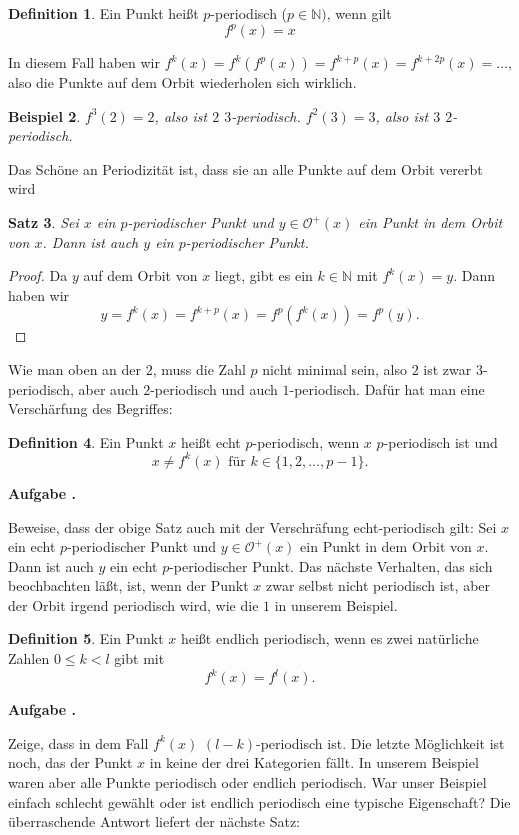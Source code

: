 \documentclass[a4paper,ngerman,12pt]{scrartcl}
\theoremstyle{definition}
\newtheorem{defn}{Definition}[section]
\theoremstyle{plain}
\newtheorem{satz}[defn]{Satz}
\newtheorem{beispiel}[defn]{Beispiel}
\theoremstyle{remark}
\newlength{\aufgabenskip}
\newcounter{aufgabennummer}
\newenvironment{aufgabe}[1]{
  \addtocounter{aufgabennummer}{1}
  \textbf{Aufgabe \theaufgabennummer.} \emph{#1} \par
}{\vspace{\aufgabenskip}}
\begin{document}
\begin{defn}
Ein Punkt heißt $p$-periodisch ($p\in\mathbb{N})$, wenn gilt
\[ 
f^p(x) =x 
\] 
\end{defn}
In diesem Fall haben wir $f^k(x) = f^k\left(f^p(x)\right) = f^{k+p} (x) = f^{k+2p} (x) = \ldots$, also die Punkte auf dem Orbit wiederholen sich wirklich. 
\begin{beispiel}
$f^{3}(2) = 2$, also ist $2$ $3$-periodisch. $f^2(3) = 3$, also ist $3$ $2$-periodisch. 
\end{beispiel}
Das Schöne an Periodizität ist, dass sie an alle Punkte auf dem Orbit vererbt wird
\begin{satz}
Sei $x$ ein $p$-periodischer Punkt und $y\in\mathcal{O}^+(x)$ ein Punkt in dem Orbit von $x$. Dann ist auch $y$ ein $p$-periodischer Punkt. 
\end{satz}
\begin{proof}
Da $y$ auf dem Orbit von $x$ liegt, gibt es ein $k\in\mathbb{N}$ mit $f^k(x) =y$. Dann haben wir 
\[
 y = f^k(x) = f^{k+p} (x) = f^{p}\left(f^{k}(x) \right) = f^p(y).
\]
\end{proof}
Wie man oben an der $2$, muss die Zahl $p$ nicht minimal sein, also $2$ ist zwar $3$-periodisch, aber auch $2$-periodisch und auch $1$-periodisch. Dafür hat man eine Verschärfung des Begriffes:
\begin{defn}
Ein Punkt $x$ heißt echt $p$-periodisch, wenn $x$ $p$-periodisch ist und 
\[
x\neq f^k(x) \text{ für } k\in\{1,2,\ldots, p-1\}.
\]
\end{defn}
\begin{aufgabe}\\
Beweise, dass der obige Satz auch mit der Verschräfung echt-periodisch gilt:
Sei $x$ ein echt $p$-periodischer Punkt und $y\in\mathcal{O}^+(x)$ ein Punkt in dem Orbit von $x$. Dann ist auch $y$ ein echt $p$-periodischer Punkt. 
\end{aufgabe}
Das nächste Verhalten, das sich beochbachten läßt, ist, wenn der Punkt $x$ zwar selbst nicht periodisch ist, aber der Orbit irgend periodisch wird, wie die $1$ in unserem Beispiel.
\begin{defn}
Ein  Punkt $x$ heißt endlich periodisch, wenn es zwei natürliche Zahlen $0\leq k < l$ gibt mit
\[
f^k(x) = f^l(x).
\]
\end{defn}
\begin{aufgabe}\\
Zeige, dass in dem Fall $f^k(x)$ $(l-k)$-periodisch ist.
\end{aufgabe}
Die letzte Möglichkeit ist noch, das der Punkt $x$ in keine der drei Kategorien fällt. In unserem Beispiel waren aber alle Punkte periodisch oder endlich periodisch. War unser Beispiel einfach schlecht gewählt oder ist endlich periodisch eine typische Eigenschaft? Die überraschende Antwort liefert der nächste Satz:
\end{document}
